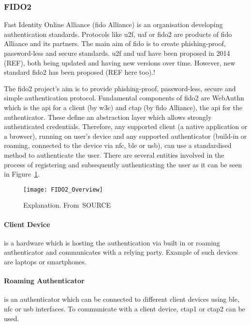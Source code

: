 \subsubsection{FIDO2}

Fast Identity Online Alliance (\acrshort{fido} Alliance) is an organisation developing authentication standards. Protocols like \acrfull{u2f}, \acrfull{uaf} or \acrshort{fido}2 are products of \acrshort{fido} Alliance and its partners.
The main aim of \acrshort{fido} is to create phishing-proof, password-less and secure standards. \acrshort{u2f} and \acrshort{uaf} have been proposed in 2014 (REF), both being updated and having new versions over time. However, new standard  \acrshort{fido}2 has been proposed 
(REF here too).!

The \acrshort{fido}2 project’s aim is to provide phishing-proof, password-less, secure and simple authentication protocol. Fundamental components of \acrshort{fido}2 are WebAuthn which is the \acrshort{api} for a client (by \acrshort{w3c}) and \acrshort{ctap} (by \acrshort{fido} Alliance), the \acrshort{api} for the authenticator. These define an abstraction layer which allows strongly authenticated credentials. Therefore, any supported client (a native application or a browser), running on user’s device and any supported authenticator (build-in or roaming, connected to the device via \acrshort{nfc}, \acrshort{ble} or \acrshort{usb}), can use a standardised method to authenticate the user. There are several entities involved in the process of registering and subsequently authenticating the user as it can be seen in Figure~\ref{fig:fido2_overview}.

\begin{figure}[ht]
    \centering
    \texttt{[image: FIDO2\_Overview]}
    \caption{Explanation. From~\cite{}SOURCE}
    \label{fig:fido2_overview}
\end{figure}

\paragraph{Client Device} 
is a hardware which is hosting the authentication via built in or roaming authenticator and communicates with a relying party. Example of such devices are laptops or smartphones. 

\paragraph{Roaming Authenticator} 
is an authenticator which can be connected to different client devices using \acrshort{ble}, \acrshort{nfc} or \acrshort{usb} interfaces. To communicate with a client device, \acrshort{ctap}1 or \acrshort{ctap}2 can be used.

